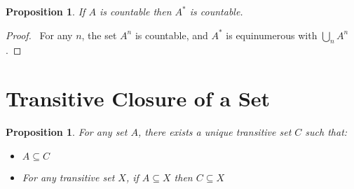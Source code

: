 \documentclass{book}
\let\qed\relax
\newtheorem{prop}[ax]{Proposition}
\theoremstyle{definition}
\begin{document}
\begin{prop}
If $A$ is countable then $A^*$ is countable.
\end{prop}

\begin{proof}
\pf\ For any $n$, the set $A^n$ is countable, and $A^*$ is equinumerous with $\bigcup_n A^n$. \qed
\end{proof}

\section{Transitive Closure of a Set}

\begin{prop}
For any set $A$, there exists a unique transitive set $C$ such that:
\begin{itemize}
\item $A \subseteq C$
\item For any transitive set $X$, if $A \subseteq X$ then $C \subseteq X$
\end{itemize}
\end{prop}
\end{document}
